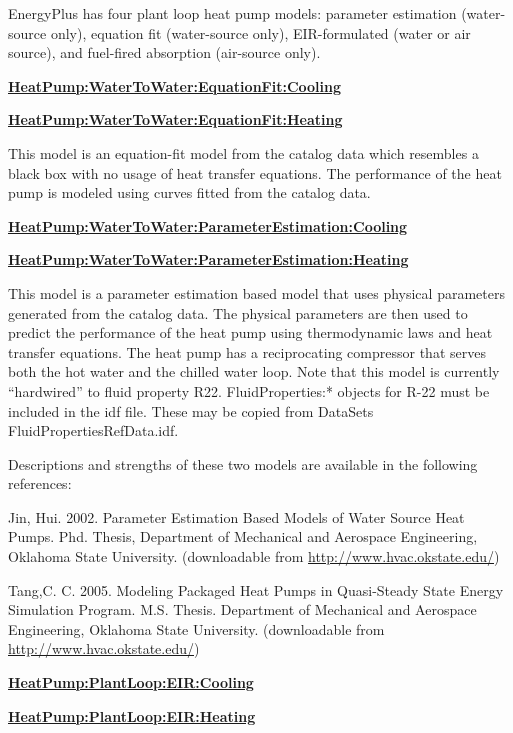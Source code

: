 EnergyPlus has four plant loop heat pump models: parameter estimation (water-source only), equation fit (water-source only), EIR-formulated (water or air source), and fuel-fired absorption (air-source only).

\textbf{\hyperref[heatpumpwatertowaterequationfitcooling]{HeatPump:WaterToWater:EquationFit:Cooling}}

\textbf{\hyperref[heatpumpwatertowaterequationfitheating]{HeatPump:WaterToWater:EquationFit:Heating}}

This model is an equation-fit model from the catalog data which resembles a black box with no usage of heat transfer equations. The performance of the heat pump is modeled using curves fitted from the catalog data.

\textbf{\hyperref[heatpumpwatertowaterparameterestimationcooling]{HeatPump:WaterToWater:ParameterEstimation:Cooling}}

\textbf{\hyperref[heatpumpwatertowaterparameterestimationheating]{HeatPump:WaterToWater:ParameterEstimation:Heating}}

This model is a parameter estimation based model that uses physical parameters generated from the catalog data. The physical parameters are then used to predict the performance of the heat pump using thermodynamic laws and heat transfer equations. The heat pump has a reciprocating compressor that serves both the hot water and the chilled water loop. Note that this model is currently ``hardwired'' to fluid property R22. FluidProperties:* objects for R-22 must be included in the idf file. These may be copied from DataSets\\FluidPropertiesRefData.idf.

Descriptions and strengths of these two models are available in the following references:

Jin, Hui. 2002. Parameter Estimation Based Models of Water Source Heat Pumps. Phd. Thesis, Department of Mechanical and Aerospace Engineering, Oklahoma State University. (downloadable from \href{http://www.hvac.okstate.edu}{http://www.hvac.okstate.edu/})

Tang,C. C. 2005. Modeling Packaged Heat Pumps in Quasi-Steady State Energy Simulation Program. M.S. Thesis. Department of Mechanical and Aerospace Engineering, Oklahoma State University. (downloadable from \href{http://www.hvac.okstate.edu}{http://www.hvac.okstate.edu/})

\textbf{\hyperref[plhp_eir]{HeatPump:PlantLoop:EIR:Cooling}}

\textbf{\hyperref[plhp_eir]{HeatPump:PlantLoop:EIR:Heating}}

